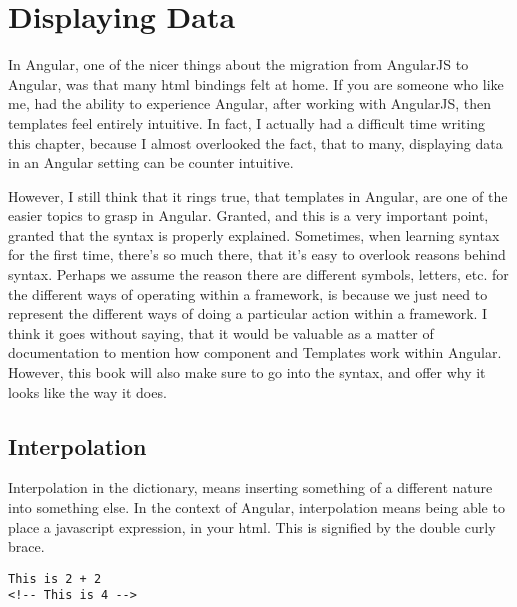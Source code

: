 \maketitle{}
\section{ Displaying Data }

In Angular, one of the nicer things about the migration from AngularJS to 
Angular, was that many html bindings felt at home. If you are someone who like
me, had the ability to experience Angular, after working with AngularJS, then 
templates feel entirely intuitive. In fact, I actually had a difficult time 
writing this chapter, because I almost overlooked the fact, that to many,
displaying data in an Angular setting can be counter intuitive.

However, I still think that it rings true, that templates in Angular, are one 
of the easier topics to grasp in Angular. Granted, and this is a very important 
point, granted that the syntax is properly explained. Sometimes, when learning 
syntax for the first time, there's so much there, that it's easy to overlook 
reasons behind syntax. Perhaps we assume the reason there are different symbols,
letters, etc. for the different ways of operating within a framework, is
because we just need to represent the different ways of doing a particular 
action within a framework. I think it goes without saying, that it would be 
valuable as a matter of documentation to mention how component and Templates 
work within Angular. However, this book will also make sure to go into the 
syntax, and offer why it looks like the way it does. 

\subsection{ Interpolation }

Interpolation in the dictionary, means inserting something of a different 
nature into something else. In the context of Angular, interpolation means
being able to place a javascript expression, in your html. This is signified 
by the double curly brace. 
\begin{lstlisting}[caption=interpolation-example.component.html]
This is 2 + 2
<!-- This is 4 --> 
\end{lstlisting}

